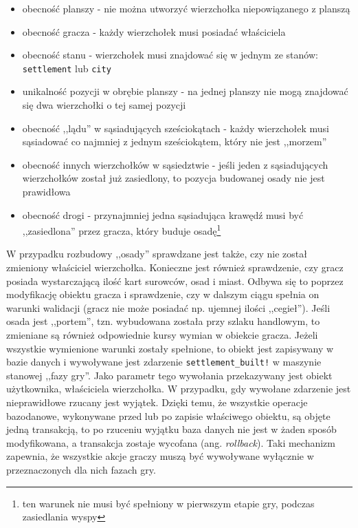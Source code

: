 \documentclass[a4paper,12pt]{article}
\begin{document}
\begin{itemize}
\item obecność planszy - nie można utworzyć wierzchołka niepowiązanego
  z planszą
\item obecność gracza - każdy wierzchołek musi posiadać właściciela
\item obecność stanu - wierzchołek musi znajdować się w jednym ze
  stanów: \texttt{settlement} lub \texttt{city}
\item unikalność pozycji w obrębie planszy - na jednej planszy nie
  mogą znajdować się dwa wierzchołki o tej samej pozycji
\item obecność ,,lądu'' w sąsiadujących sześciokątach - każdy
  wierzchołek musi sąsiadować co najmniej z jednym sześciokątem, który
  nie jest ,,morzem''
\item obecność innych wierzchołków w sąsiedztwie - jeśli jeden z
  sąsiadujących wierzchołków został już zasiedlony, to pozycja
  budowanej osady nie jest prawidłowa
\item obecność drogi - przynajmniej jedna sąsiadująca krawędź musi być
  ,,zasiedlona'' przez gracza, który buduje osadę\footnote{ten warunek
    nie musi być spełniony w pierwszym etapie gry, podczas
    zasiedlania wyspy}
\end{itemize}

W przypadku rozbudowy ,,osady'' sprawdzane jest także, czy nie został
zmieniony właściciel wierzchołka. Konieczne jest również sprawdzenie,
czy gracz posiada wystarczającą ilość kart surowców, osad i
miast. Odbywa się to poprzez modyfikację obiektu gracza i sprawdzenie,
czy w dalszym ciągu spełnia on warunki walidacji (gracz nie może
posiadać np. ujemnej ilości ,,cegieł''). Jeśli osada jest ,,portem'',
tzn. wybudowana została przy szlaku handlowym, to zmieniane są również
odpowiednie kursy wymian w obiekcie gracza. Jeżeli wszystkie
wymienione warunki zostały spełnione, to obiekt jest zapisywany w
bazie danych i wywoływane jest zdarzenie \texttt{settlement\_built!} w
maszynie stanowej ,,fazy gry''. Jako parametr tego wywołania
przekazywany jest obiekt użytkownika, właściciela wierzchołka. W
przypadku, gdy wywołane zdarzenie jest nieprawidłowe rzucany jest
wyjątek. Dzięki temu, że wszystkie operacje bazodanowe, wykonywane
przed lub po zapisie właściwego obiektu, są objęte jedną transakcją,
to po rzuceniu wyjątku baza danych nie jest w żaden sposób
modyfikowana, a transakcja zostaje wycofana
(ang. \emph{rollback}). Taki mechanizm zapewnia, że wszystkie akcje
graczy muszą być wywoływane wyłącznie w przeznaczonych dla nich fazach
gry.
\end{document}
